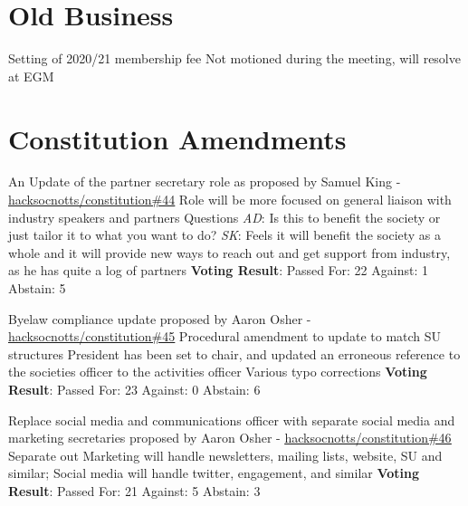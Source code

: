 \documentclass[11pt]{meetingmins}
\begin{document}
\section{Old Business}
\begin{items}
	\item
	Setting of 2020/21 membership fee
		\subitem
		Not motioned during the meeting, will resolve at EGM
\end{items}

\section{Constitution Amendments}
\begin{items}
	\item
	An Update of the partner secretary role as proposed by Samuel King - \underline{\href{https://github.com/HackSocNotts/constitution/pull/44}{hacksocnotts/constitution\#44}}
		\subitem
		Role will be more focused on general liaison with industry speakers and partners 
		\subitem
		Questions
			\subsubitem
			\textit{AD}: Is this to benefit the society or just tailor it to what you want to do?
			\subsubitem
			\textit{SK}: Feels it will benefit the society as a whole and it will provide new ways to reach out and get support from industry, as he has quite a log of partners
		\subitem
		\textbf{Voting Result}: Passed
			\subsubitem
			For: 22
			\subsubitem
			Against: 1
			\subsubitem
			Abstain: 5
			
	\item
	Byelaw compliance update proposed by Aaron Osher - \underline{\href{https://github.com/HackSocNotts/constitution/pull/45}{hacksocnotts/constitution\#45}}
		\subitem
		Procedural amendment to update to match SU structures
		\subitem
		President has been set to chair, and updated an erroneous reference to the societies officer to the activities officer
		\subitem
		Various typo corrections
		\subitem
		\textbf{Voting Result}: Passed
			\subsubitem
			For: 23
			\subsubitem
			Against: 0
			\subsubitem
			Abstain: 6
	
	\item
	Replace social media and communications officer with separate social media and marketing secretaries proposed by Aaron Osher - \underline{\href{https://github.com/HackSocNotts/constitution/pull/46}{hacksocnotts/constitution\#46}}
		\subitem
		Separate out Marketing will handle newsletters, mailing lists, website, SU and similar; Social media will handle twitter, engagement, and similar
		\subitem
		\textbf{Voting Result}: Passed
			\subsubitem
			For: 21
			\subsubitem
			Against: 5
			\subsubitem
			Abstain: 3

\end{items}
\end{document}
